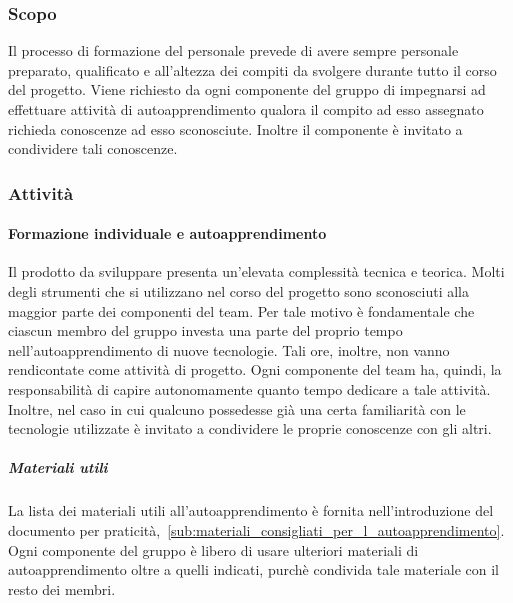 \documentclass[../../norme-di-progetto.tex]{subfiles}
\begin{document}
\subsubsection{Scopo}%
\label{subs:formazione_del_personale/scopo}

Il processo di formazione del personale prevede di avere sempre personale preparato, qualificato e all'altezza dei compiti da svolgere durante tutto il corso del progetto.
Viene richiesto da ogni componente del gruppo di impegnarsi ad effettuare attività di autoapprendimento qualora il compito
ad esso assegnato richieda conoscenze ad esso sconosciute. Inoltre il componente è invitato a condividere tali conoscenze.

\subsubsection{Attività}%
\label{subs:formazione_del_personale/attivita}

\paragraph{Formazione individuale e autoapprendimento}%
\label{par:formazione_individuale_e_autoapprendimento}

Il prodotto da sviluppare presenta un'elevata complessità tecnica e teorica.
Molti degli strumenti che si utilizzano nel corso del progetto sono sconosciuti alla maggior parte dei componenti del team.
Per tale motivo è fondamentale che ciascun membro del gruppo investa una parte del proprio tempo nell'autoapprendimento di nuove tecnologie.
Tali ore, inoltre, non vanno rendicontate come attività di progetto.
Ogni componente del team ha, quindi, la responsabilità di capire autonomamente quanto tempo dedicare a tale attività.
Inoltre, nel caso in cui qualcuno possedesse già una certa familiarità con le tecnologie utilizzate è invitato a condividere le proprie conoscenze con gli altri.

\subparagraph{Materiali utili}%
\label{subp:materiali_utili}

La lista dei materiali utili all'autoapprendimento è fornita nell'introduzione del documento per praticità,~\ref{sub:materiali_consigliati_per_l_autoapprendimento}.
Ogni componente del gruppo è libero di usare ulteriori materiali di autoapprendimento oltre a quelli indicati, purchè condivida tale materiale con il resto dei membri.
\end{document}
